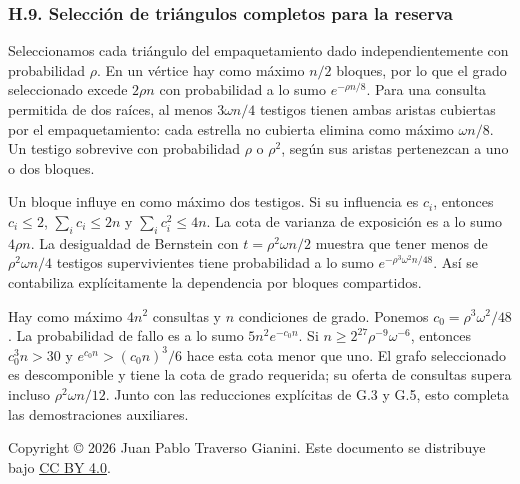 \documentclass[spanish,11pt,a4paper]{article}
\begin{document}
\subsubsection{H.9. Selección de triángulos completos para la reserva}\label{h.9.-selecciuxf3n-de-triuxe1ngulos-completos-para-la-reserva}

Seleccionamos cada triángulo del empaquetamiento dado independientemente con probabilidad \(\rho\). En un vértice hay como máximo \(n/2\) bloques, por lo que el grado seleccionado excede \(2\rho n\) con probabilidad a lo sumo \(e^{-\rho n/8}\). Para una consulta permitida de dos raíces, al menos \(3\omega n/4\) testigos tienen ambas aristas cubiertas por el empaquetamiento: cada estrella no cubierta elimina como máximo \(\omega n/8\). Un testigo sobrevive con probabilidad \(\rho\) o \(\rho^2\), según sus aristas pertenezcan a uno o dos bloques.

Un bloque influye en como máximo dos testigos. Si su influencia es \(c_i\), entonces \(c_i\le2\), \(\sum_i c_i\le2n\) y \(\sum_i c_i^2\le4n\). La cota de varianza de exposición es a lo sumo \(4\rho n\). La desigualdad de Bernstein con \(t=\rho^2\omega n/2\) muestra que tener menos de \(\rho^2\omega n/4\) testigos supervivientes tiene probabilidad a lo sumo \(e^{-\rho^3\omega^2n/48}\). Así se contabiliza explícitamente la dependencia por bloques compartidos.

Hay como máximo \(4n^2\) consultas y \(n\) condiciones de grado. Ponemos \(c_0=\rho^3\omega^2/48\). La probabilidad de fallo es a lo sumo \(5n^2e^{-c_0n}\). Si \(n\ge2^{27}\rho^{-9}\omega^{-6}\), entonces \(c_0^3n>30\) y \(e^{c_0n}>(c_0n)^3/6\) hace esta cota menor que uno. El grafo seleccionado es descomponible y tiene la cota de grado requerida; su oferta de consultas supera incluso \(\rho^2\omega n/12\). Junto con las reducciones explícitas de G.3 y G.5, esto completa las demostraciones auxiliares.

Copyright © 2026 Juan Pablo Traverso Gianini. Este documento se distribuye bajo \href{https://creativecommons.org/licenses/by/4.0/}{CC BY 4.0}.
\end{document}
